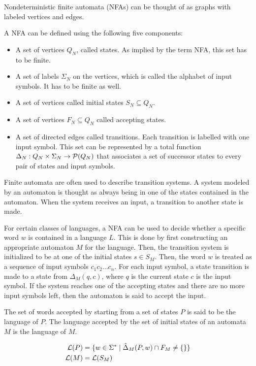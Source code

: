 Nondeterministic finite automata (NFAs) can be thought of
as graphs with labeled vertices and edges.

\begin{definition}
    A NFA can be defined using the following five components:

    \begin{itemize}
        \item A set of vertices $Q_N$, called states.
            As implied by the term NFA, this set has to be finite.
        \item A set of labels $\Sigma_N$ on the vertices,
            which is called the alphabet of input symbols.
            It has to be finite as well.
        \item A set of vertices called initial states $S_N \subseteq Q_N$.
        \item A set of vertices $F_N \subseteq Q_N$ called accepting states.
        \item A set of directed edges called transitions.
            Each transition is labelled with one input symbol.
            This set can be represented by a total function
            $\Delta_N : Q_N \times \Sigma_N \rightarrow \mathcal{P}(Q_N)$
            that associates a set of successor states to every pair of states and input symbols.
    \end{itemize}
\end{definition}

Finite automata are often used to describe transition systems.
A system modeled by an automaton is thought as
always being in one of the states contained in the automaton.
When the system receives an input, a transition to another state is made.

For certain classes of languages, a NFA can be used to decide
whether a specific word $w$ is contained in a language $L$.
This is done by first constructing an appropriate automaton $M$ for the language.
Then, the transition system is initialized to be at one of the initial states $s \in S_M$.
Then, the word $w$ is treated as a sequence of input symbols $c_1 c_2 \ldots c_n$.
For each input symbol, a state transition is made to a state from $\Delta_{M}(q, c)$,
where $q$ is the current state $c$ is the input symbol.
If the system reaches one of the accepting states and there are no more input symbols left,
then the automaton is said to accept the input.

\begin{definition}
    The set of words accepted by starting from a set of states $P$
    is said to be the language of $P$.
    The language accepted by the set of initial states of an automata $M$ is the language of $M$.

    \begin{align}
        \mathcal{L}(P) &= \{ w \in \Sigma^\ast \mid \hat\Delta_M(P, w) \cap F_M \neq \{ \} \}\\
        \mathcal{L}(M) &= \mathcal{L}(S_M)
    \end{align}
\end{definition}

